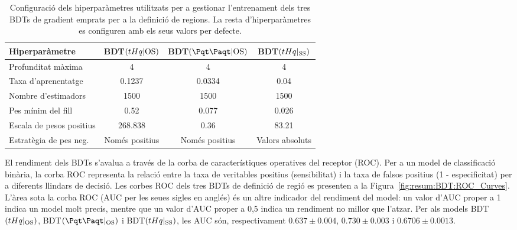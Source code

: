 \begin{table}[h]
\centering
\begin{tabular}{l|c|c|c}
\toprule
Hiperparàmetre 		& BDT$(tHq|{\text{OS}})$ & BDT$(\ttbar|{\text{OS}})$ & BDT$(tHq|_{\text{SS}})$ \\ \midrule
Profunditat màxima 		&  4 & 4 & 4 \\
Taxa d'aprenentatge 		& 0.1237 & 0.0334 & 0.04 \\
Nombre d'estimadors 	& 1500 & 1500 & 1500 \\
Pes mínim del fill 		& 0.52 & 0.077 & 0.026 \\
Escala de pesos positius 	& 268.838 & 0.36 & 83.21 \\
Estratègia de pes neg. 	& Només positius & Només positius & Valors absoluts \\ \bottomrule
\end{tabular}
\caption{Configuració dels hiperparàmetres utilitzats per a gestionar l'entrenament dels tres BDTs de 
gradient emprats per a la definició de regions. La resta d'hiperparàmetres es configuren amb els seus valors per defecte.}
\label{tab:resum:BDT:Hyperparameters}
\end{table}



El rendiment dels BDTs s'avalua a través de la corba de característiques operatives del 
receptor (ROC). Per a un model de classificació binària, la corba ROC representa la relació 
entre la taxa de veritables positius (sensibilitat) i la taxa de falsos positius (1 - especificitat) 
per a diferents llindars de decisió. 
Les corbes ROC dels tres BDTs de definició de regió es presenten a la Figura~\ref{fig:resum:BDT:ROC_Curves}. 
L'àrea sota la corba ROC (AUC per les seues sigles en anglés) és un altre indicador del rendiment del model: un valor d'AUC 
proper a 1 indica un model molt precís, mentre que un valor d'AUC proper a 0,5 indica un 
rendiment no millor que l'atzar. Per als models BDT$(tHq|_{\text{OS}})$, BDT$(\ttbar|_{\text{OS}})$ i BDT$(tHq|_{\text{SS}})$,
les AUC són, respectivament $0.637\pm0.004$, $0.730 \pm 0.003$ i $0.6706 \pm0.0013$.


